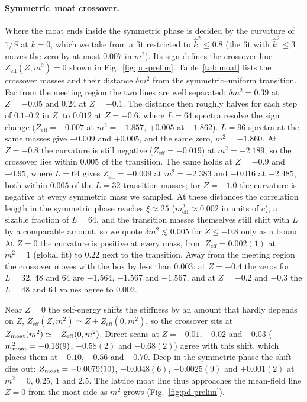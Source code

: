 \documentclass[aps,prd,twocolumn,superscriptaddress,nofootinbib,10pt]{revtex4-2}
\newcommand{\khat}{\widehat{k}^{2}}
\newcommand{\eff}{\mathrm{eff}}
\begin{document}
\paragraph*{Symmetric--moat crossover.}\label{sec:moat-line}
Where the moat ends inside the symmetric phase is decided by the curvature of
$1/S$ at $k=0$, which we take from a fit restricted to $\khat\le0.8$ (the
fit with $\khat\le3$ moves the zero by at most $0.007$ in $m^2$).  Its sign
defines the crossover line $Z_\eff(Z,m^2)=0$ shown in
Fig.~\ref{fig:pd-prelim}.  Table~\ref{tab:moat} lists the crossover masses
and their distance $\delta m^2$ from the symmetric--uniform transition.
Far from the meeting region the two lines are well separated:
$\delta m^2=0.39$ at $Z=-0.05$ and $0.24$ at $Z=-0.1$.  The distance then
roughly halves for each step of $0.1$--$0.2$ in $Z$, to $0.012$ at
$Z=-0.6$, where $L=64$ spectra resolve the sign change ($Z_\eff=-0.007$ at
$m^2=-1.857$, $+0.005$ at $-1.862$).  $L=96$ spectra at the same masses
give $-0.009$ and $+0.005$, and the same zero, $m^2=-1.860$.  At $Z=-0.8$
the curvature is still negative ($Z_\eff=-0.019$) at $m^2=-2.189$, so the
crossover lies within $0.005$ of the transition.  The same holds at
$Z=-0.9$ and $-0.95$, where $L=64$ gives $Z_\eff=-0.009$ at $m^2=-2.383$
and $-0.016$ at $-2.485$, both within $0.005$ of the $L=32$ transition
masses; for $Z=-1.0$ the curvature is negative at every symmetric mass we
sampled.  At these distances the correlation length in the symmetric
phase reaches $\xi\approx25$ ($m^2_\eff\approx0.002$ in units of $c$), a
sizable fraction of $L=64$, and the transition masses themselves still
shift with $L$ by a comparable amount, so we quote
$\delta m^2\lesssim0.005$ for $Z\le-0.8$ only as a bound.  At $Z=0$ the
curvature is positive at every mass, from $Z_\eff=0.002(1)$ at $m^2=1$
(global fit) to $0.22$ next to the transition.  Away from the meeting
region the crossover moves with the box by less than $0.003$: at $Z=-0.4$
the zeros for $L=32$, $48$ and $64$ are $-1.564$, $-1.567$ and $-1.567$,
and at $Z=-0.2$ and $-0.3$ the $L=48$ and $64$ values agree to $0.002$.

Near $Z=0$ the self-energy shifts the stiffness by an amount that hardly
depends on $Z$, $Z_\eff(Z,m^2)\simeq Z+Z_\eff(0,m^2)$, so the crossover
sits at $Z_{\rm moat}(m^2)\simeq-Z_\eff(0,m^2)$.  Direct scans at
$Z=-0.01$, $-0.02$ and $-0.03$ ($m^2_{\rm moat}=-0.16(9)$, $-0.58(2)$ and
$-0.68(2)$) agree with this shift, which places them at $-0.10$, $-0.56$ and $-0.70$.  Deep in the symmetric phase the shift
dies out: $Z_{\rm moat}=-0.0079(10)$, $-0.0048(6)$, $-0.0025(9)$ and
$+0.001(2)$ at $m^2=0$, $0.25$, $1$ and $2.5$.  The lattice moat line thus
approaches the mean-field line $Z=0$ from the moat side as $m^2$ grows
(Fig.~\ref{fig:pd-prelim}).
\end{document}
